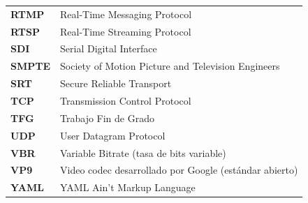 \begin{tabular}{lp{12cm}}
  \textbf{RTMP}  & Real-Time Messaging Protocol \\
  \textbf{RTSP}  & Real-Time Streaming Protocol \\
  \textbf{SDI}   & Serial Digital Interface \\
  \textbf{SMPTE} & Society of Motion Picture and Television Engineers \\
  \textbf{SRT}   & Secure Reliable Transport \\
  \textbf{TCP}   & Transmission Control Protocol \\
  \textbf{TFG}   & Trabajo Fin de Grado \\
  \textbf{UDP}   & User Datagram Protocol \\
  \textbf{VBR}   & Variable Bitrate (tasa de bits variable) \\
  \textbf{VP9}   & Video codec desarrollado por Google (estándar abierto) \\
  \textbf{YAML}  & YAML Ain't Markup Language \\
\end{tabular}

\newpage
